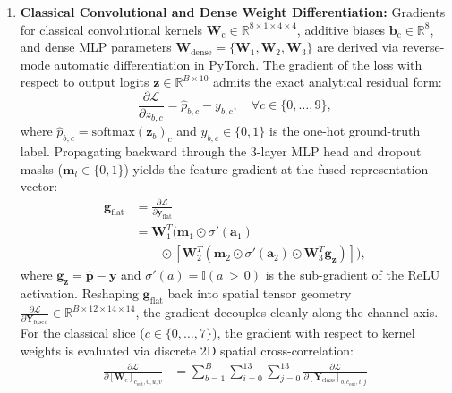 \documentclass[journal]{IEEEtran}
\begin{document}
\begin{enumerate}
    \item \textbf{Classical Convolutional and Dense Weight Differentiation:} Gradients for classical convolutional kernels $\mathbf{W}_{\mathrm{c}} \in \mathbb{R}^{8 \times 1 \times 4 \times 4}$, additive biases $\mathbf{b}_{\mathrm{c}} \in \mathbb{R}^8$, and dense MLP parameters $\mathbf{W}_{\mathrm{dense}} = \{\mathbf{W}_1, \mathbf{W}_2, \mathbf{W}_3\}$ are derived via reverse-mode automatic differentiation in PyTorch. The gradient of the loss with respect to output logits $\mathbf{z} \in \mathbb{R}^{B \times 10}$ admits the exact analytical residual form:
    \begin{equation}
    \frac{\partial \mathcal{L}}{\partial z_{b, c}} = \hat{p}_{b, c} - y_{b, c}, \quad \forall c \in \{0, \dots, 9\},
    \label{eq:logit_residual_gradient}
    \end{equation}
    where $\hat{p}_{b, c} = \mathrm{softmax}(\mathbf{z}_b)_c$ and $y_{b, c} \in \{0, 1\}$ is the one-hot ground-truth label. Propagating backward through the 3-layer MLP head and dropout masks ($\mathbf{m}_l \in \{0, 1\}$) yields the feature gradient at the fused representation vector:
    \begin{align}
    \mathbf{g}_{\mathrm{flat}} &= \frac{\partial \mathcal{L}}{\partial \mathbf{y}_{\mathrm{flat}}} \nonumber \\
    &= \mathbf{W}_1^T \Big( \mathbf{m}_1 \odot \sigma'(\mathbf{a}_1) \nonumber \\
    &\qquad \odot \left[ \mathbf{W}_2^T \left( \mathbf{m}_2 \odot \sigma'(\mathbf{a}_2) \odot \mathbf{W}_3^T \mathbf{g}_{\mathbf{z}} \right) \right] \Big),
    \label{eq:dense_head_backprop}
    \end{align}
    where $\mathbf{g}_{\mathbf{z}} = \hat{\mathbf{p}} - \mathbf{y}$ and $\sigma'(a) = \mathbb{I}(a \,{>}\, 0)$ is the sub-gradient of the ReLU activation. Reshaping $\mathbf{g}_{\mathrm{flat}}$ back into spatial tensor geometry $\frac{\partial \mathcal{L}}{\partial \mathbf{Y}_{\mathrm{fused}}} \in \mathbb{R}^{B \times 12 \times 14 \times 14}$, the gradient decouples cleanly along the channel axis. For the classical slice ($c \in \{0, \dots, 7\}$), the gradient with respect to kernel weights is evaluated via discrete 2D spatial cross-correlation:
    \begin{align}
    \frac{\partial \mathcal{L}}{\partial [\mathbf{W}_{\mathrm{c}}]_{c_{\mathrm{out}}, 0, u, v}} &= \sum_{b=1}^B \sum_{i=0}^{13} \sum_{j=0}^{13} \frac{\partial \mathcal{L}}{\partial [\mathbf{Y}_{\mathrm{class}}]_{b, c_{\mathrm{out}}, i, j}} \nonumber \\

\end{align}
\end{enumerate}
\end{document}
